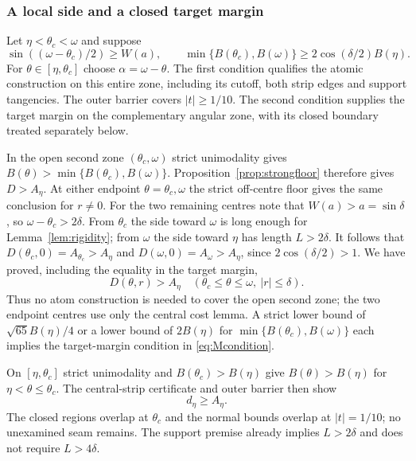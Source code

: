 \documentclass[11pt,a4paper]{article}
\begin{document}
\subsubsection{A local side and a closed target margin}
Let $\eta<\theta_c<\omega$ and suppose
\begin{equation}\label{eq:Mcondition}
 \sin((\omega-\theta_c)/2)\ge W(a),\qquad
 \min\{B(\theta_c),B(\omega)\}\ge2\cos(\delta/2)B(\eta).
\end{equation}
For $\theta\in[\eta,\theta_c]$ choose $\alpha=\omega-\theta$.
The first condition qualifies the atomic construction on this
entire zone, including its cutoff, both strip edges and support
tangencies. The outer barrier covers $|t|\ge1/10$.
The second condition supplies the target margin on the complementary
angular zone, with its closed boundary treated separately below.

In the open second zone $(\theta_c,\omega)$ strict unimodality
gives $B(\theta)>\min\{B(\theta_c),B(\omega)\}$.
Proposition~\ref{prop:strongfloor} therefore gives $D>A_\eta$.
At either endpoint $\theta=\theta_c,\omega$ the strict
off-centre floor gives the same conclusion for $r\ne0$.
For the two remaining centres note that $W(a)>a=\sin\delta$,
so $\omega-\theta_c>2\delta$. From $\theta_c$ the side toward
$\omega$ is long enough for Lemma~\ref{lem:rigidity}; from
$\omega$ the side toward $\eta$ has length $L>2\delta$.
It follows that $D(\theta_c,0)=A_{\theta_c}>A_\eta$ and
$D(\omega,0)=A_\omega>A_\eta$, since $2\cos(\delta/2)>1$.
We have proved, including the equality in the target margin,
\begin{equation}\label{eq:Mright}
 D(\theta,r)>A_\eta
 \quad(\theta_c\le\theta\le\omega,\ |r|\le\delta).
\end{equation}
Thus no atom construction is needed to cover the open second zone;
the two endpoint centres use only the central cost lemma.
A strict lower bound of $\sqrt{65}B(\eta)/4$ or a lower bound
of $2B(\eta)$ for $\min\{B(\theta_c),B(\omega)\}$ each implies the
target-margin condition in \eqref{eq:Mcondition}.

On $[\eta,\theta_c]$ strict unimodality and $B(\theta_c)>B(\eta)$
give $B(\theta)>B(\eta)$ for $\eta<\theta\le\theta_c$.
The central-strip certificate and outer barrier then show
\begin{equation}\label{eq:Mlower}
 d_\eta\ge A_\eta.
\end{equation}
The closed regions overlap at $\theta_c$ and the normal
bounds overlap at $|t|=1/10$; no unexamined seam remains.
The support premise already implies $L>2\delta$ and does
not require $L>4\delta$.
\end{document}

